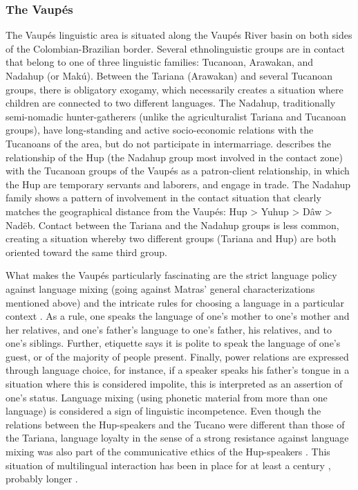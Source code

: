 \documentclass[output=paper]{langscibook}
\begin{document}
\subsubsection{The Vaupés}

The Vaupés linguistic area \parencite[e.g.,][]{Aikhenvald2002Language, Aikhenvald2003Multilingualism, Epps2007Vaupes} is situated along the Vaupés River basin on both sides of the Colombian-Brazilian border. Several ethnolinguistic groups are in contact that belong to one of three linguistic families: Tucanoan, Arawakan, and Nadahup (or Makú). Between the Tariana (Arawakan) and several Tucanoan groups, there is obligatory exogamy, which necessarily creates a situation where children are connected to two different languages. The Nadahup, traditionally semi-nomadic hunter-gatherers (unlike the agriculturalist Tariana and Tucanoan groups), have long-standing and active socio-economic relations with the Tucanoans of the area, but do not participate in intermarriage. \textcite[268]{Epps2007Vaupes} describes the relationship of the Hup (the Nadahup group most involved in the contact zone) with the Tucanoan groups of the Vaupés as a patron-client relationship, in which the Hup are temporary servants and laborers, and engage in trade. The Nadahup family shows a pattern of involvement in the contact situation that clearly matches the geographical distance from the Vaupés: Hup > Yuhup > Dâw > Nadëb. Contact between the Tariana and the Nadahup groups is  less common, creating a situation whereby two different groups (Tariana and Hup) are both oriented toward the same third group.

What makes the Vaupés particularly fascinating are the strict language policy against language mixing (going against Matras' general characterizations mentioned above) and the intricate rules for choosing a language in a particular context \parencite{Aikhenvald2003Multilingualism}. As a rule, one speaks the language of one's mother to one's mother and her relatives, and one's father's language to one's father, his relatives, and to one's siblings. Further, etiquette says it is polite to speak the language of one's guest, or of the majority of people present. Finally, power relations are expressed through language choice, for instance, if a speaker speaks his father's tongue in a situation where this is considered impolite, this is interpreted as an assertion of one's status. Language mixing (using phonetic material from more than one language) is considered a sign of linguistic incompetence. Even though the relations between the Hup-speakers and the Tucano were different than those of the Tariana, language loyalty in the sense of a strong resistance against language mixing was also part of the communicative ethics of the Hup-speakers \parencite{Epps2007Vaupes}. This situation of multilingual interaction has been in place for at least a century \parencite{Epps2007Vaupes}, probably longer \parencite[24]{Aikhenvald2002Language}.
\end{document}
